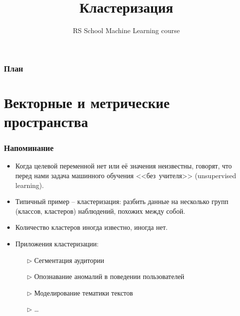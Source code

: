 \documentclass[unicode]{beamer}
\title[Кластеризация]{Кластеризация}
\author[]{RS School Machine Learning course}
\institute[]{}
\date[]{}
\begin{document}
\begin{frame}
  \titlepage
\end{frame}

\begin{frame}
  \frametitle{План}
  \tableofcontents
\end{frame}

\section{Векторные и метрические пространства}

\begin{frame}[t]
\frametitle{Напоминание}

\begin{itemize}
\item Когда целевой переменной нет или её значения неизвестны, говорят, что перед нами задача машинного обучения <<без~учителя>> (unsupervised learning).
\item Типичный пример -- кластеризация: разбить данные на несколько групп (классов, кластеров) наблюдений, похожих между собой.
\item Количество кластеров иногда известно, иногда нет.
\item Приложения кластеризации:
  \begin{itemize}
  \item[$\rhd$] Сегментация аудитории
  \item[$\rhd$] Опознавание аномалий в поведении пользователей
  \item[$\rhd$] Моделирование тематики текстов
  \item[$\rhd$] \dots
  \end{itemize}
\end{itemize}

\end{frame}
\end{document}
